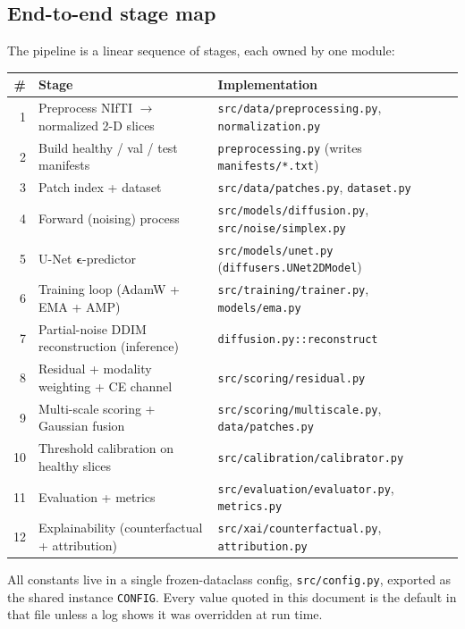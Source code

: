\documentclass[11pt,a4paper]{article}
\newcommand{\eps}{\bm{\epsilon}}
\newcommand{\code}[1]{\texttt{\small #1}}
\begin{document}
\subsection{End-to-end stage map}
The pipeline is a linear sequence of stages, each owned by one module:

\begin{longtable}{@{}rll@{}}
\toprule
\# & Stage & Implementation \\
\midrule
\endhead
1  & Preprocess NIfTI $\to$ normalized 2-D slices & \code{src/data/preprocessing.py}, \code{normalization.py} \\
2  & Build healthy / val / test manifests        & \code{preprocessing.py} (writes \code{manifests/*.txt}) \\
3  & Patch index + dataset                        & \code{src/data/patches.py}, \code{dataset.py} \\
4  & Forward (noising) process                    & \code{src/models/diffusion.py}, \code{src/noise/simplex.py} \\
5  & U-Net $\eps$-predictor                        & \code{src/models/unet.py} (\code{diffusers.UNet2DModel}) \\
6  & Training loop (AdamW + EMA + AMP)            & \code{src/training/trainer.py}, \code{models/ema.py} \\
7  & Partial-noise DDIM reconstruction (inference)& \code{diffusion.py::reconstruct} \\
8  & Residual + modality weighting + CE channel   & \code{src/scoring/residual.py} \\
9  & Multi-scale scoring + Gaussian fusion        & \code{src/scoring/multiscale.py}, \code{data/patches.py} \\
10 & Threshold calibration on healthy slices      & \code{src/calibration/calibrator.py} \\
11 & Evaluation + metrics                         & \code{src/evaluation/evaluator.py}, \code{metrics.py} \\
12 & Explainability (counterfactual + attribution)& \code{src/xai/counterfactual.py}, \code{attribution.py} \\
\bottomrule
\end{longtable}

\noindent
All constants live in a single frozen-dataclass config,
\code{src/config.py}, exported as the shared instance \code{CONFIG}. Every value
quoted in this document is the default in that file unless a log shows it was
overridden at run time.
\end{document}
